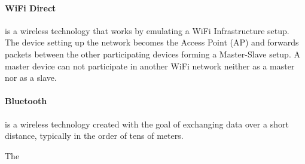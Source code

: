 \paragraph{WiFi Direct}
is a wireless technology that works by emulating a WiFi Infrastructure setup. The device setting up the network becomes the Access Point (AP) and forwards packets between the other participating devices forming a Master-Slave setup.
A master device can not participate in another WiFi network neither as a master nor as a slave.

\paragraph{Bluetooth}
is a wireless technology created with the goal of exchanging data over a short distance, typically in the order of tens of meters.

The